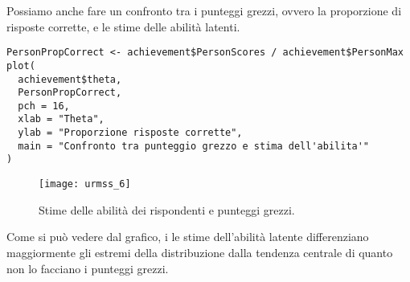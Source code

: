 Possiamo anche fare un confronto tra i punteggi grezzi, ovvero la proporzione di risposte corrette, e le stime delle abilità latenti.

\begin{lstlisting} 
PersonPropCorrect <- achievement$PersonScores / achievement$PersonMax
plot(
  achievement$theta, 
  PersonPropCorrect,
  pch = 16,
  xlab = "Theta",
  ylab = "Proporzione risposte corrette",
  main = "Confronto tra punteggio grezzo e stima dell'abilita'"
)
\end{lstlisting} 

\begin{figure}[h!]
  \begin{center}
    \texttt{[image: urmss\_6]}
    \caption{Stime delle abilità dei rispondenti e punteggi grezzi.}
    \label{fig:urmss_6}
  \end{center}
\end{figure}

Come si può vedere dal grafico, i le stime dell'abilità latente differenziano maggiormente gli estremi della distribuzione dalla tendenza centrale di quanto non lo facciano i punteggi grezzi.

